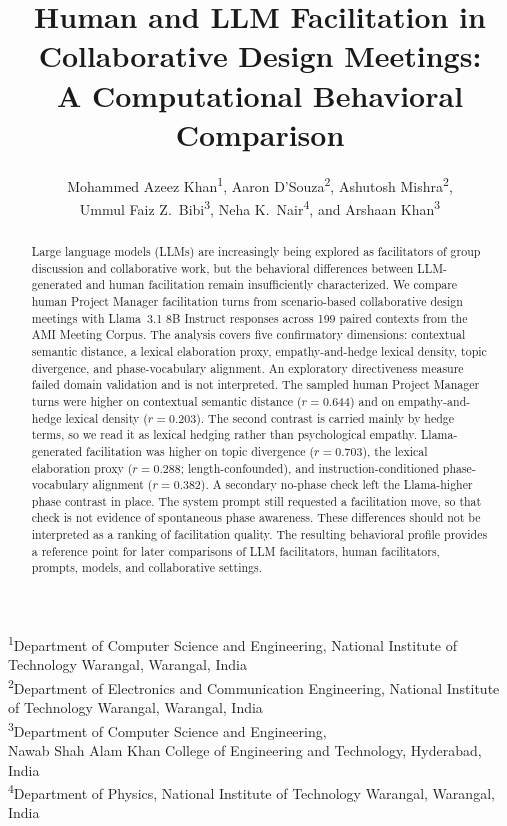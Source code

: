 \documentclass[11pt]{article}
\title{Human and LLM Facilitation in Collaborative Design Meetings:\\ A Computational Behavioral Comparison}
\author{%
Mohammed Azeez Khan\textsuperscript{1},
Aaron D'Souza\textsuperscript{2},
Ashutosh Mishra\textsuperscript{2},\\
Ummul Faiz Z.\ Bibi\textsuperscript{3},
Neha K.\ Nair\textsuperscript{4},
and Arshaan Khan\textsuperscript{3}
}
\date{}
\begin{document}
\maketitle
\vspace{-1.2em}
\begin{center}
\small
\textsuperscript{1}Department of Computer Science and Engineering, National Institute of Technology Warangal, Warangal, India\\
\textsuperscript{2}Department of Electronics and Communication Engineering, National Institute of Technology Warangal, Warangal, India\\
\textsuperscript{3}Department of Computer Science and Engineering,\\
Nawab Shah Alam Khan College of Engineering and Technology, Hyderabad, India\\
\textsuperscript{4}Department of Physics, National Institute of Technology Warangal, Warangal, India
\end{center}
\vspace{0.6em}

\begin{abstract}
Large language models (LLMs) are increasingly being explored as facilitators of group discussion and collaborative work, but the behavioral differences between LLM-generated and human facilitation remain insufficiently characterized. We compare human Project Manager facilitation turns from scenario-based collaborative design meetings with Llama~3.1 8B Instruct responses across 199 paired contexts from the AMI Meeting Corpus. The analysis covers five confirmatory dimensions: contextual semantic distance, a lexical elaboration proxy, empathy-and-hedge lexical density, topic divergence, and phase-vocabulary alignment. An exploratory directiveness measure failed domain validation and is not interpreted. The sampled human Project Manager turns were higher on contextual semantic distance ($r = 0.644$) and on empathy-and-hedge lexical density ($r = 0.203$). The second contrast is carried mainly by hedge terms, so we read it as lexical hedging rather than psychological empathy. Llama-generated facilitation was higher on topic divergence ($r = 0.703$), the lexical elaboration proxy ($r = 0.288$; length-confounded), and instruction-conditioned phase-vocabulary alignment ($r = 0.382$). A secondary no-phase check left the Llama-higher phase contrast in place. The system prompt still requested a facilitation move, so that check is not evidence of spontaneous phase awareness. These differences should not be interpreted as a ranking of facilitation quality. The resulting behavioral profile provides a reference point for later comparisons of LLM facilitators, human facilitators, prompts, models, and collaborative settings.
\end{abstract}
\end{document}
